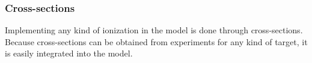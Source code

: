 %
%
%



\subsubsection{Cross-sections}
\label{section:intro:md:cross-sections}

Implementing any kind of ionization in the model is done through cross-sections.
Because cross-sections can be obtained from experiments for any kind of target,
it is easily integrated into the model.



